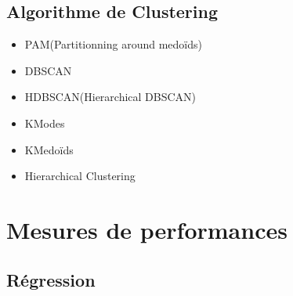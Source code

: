 \documentclass[french]{article}
\begin{document}
\subsection{Algorithme de Clustering}
	\begin{itemize}[label = \textbullet, font=\LARGE \color{purple}]
	\item PAM(Partitionning around medoïds)	
	\item DBSCAN
	\item HDBSCAN(Hierarchical DBSCAN)
	\item KModes
	\item KMedoïds
	\item Hierarchical Clustering
	\end{itemize}

	
	\section{Mesures de performances}
	\subsection{Régression}
	
\end{document}
